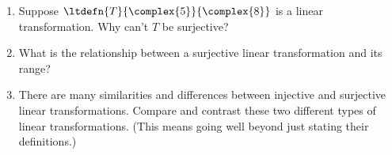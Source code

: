 \begin{enumerate}
%
\item Suppose $\ltdefn{T}{\complex{5}}{\complex{8}}$ is a linear transformation.  Why can't $T$ be surjective?
%
\item What is the relationship between a surjective linear transformation and its range?
%
\item There are many similarities and differences between injective and surjective linear transformations.  Compare and contrast these two different types of linear transformations.  (This means going well beyond just stating their definitions.)
%
\end{enumerate}